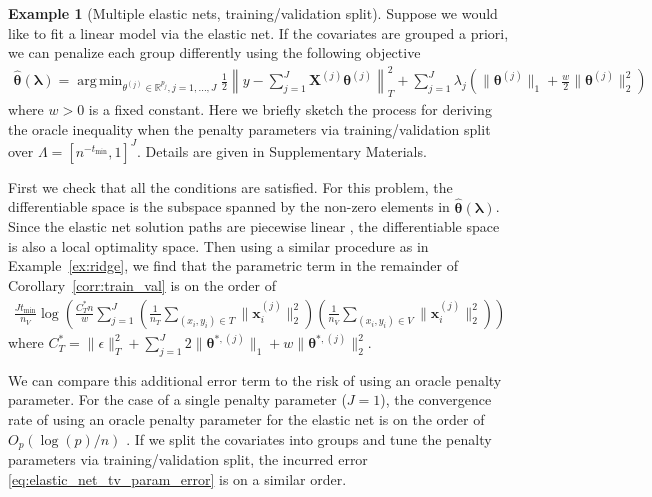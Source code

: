 \documentclass[12pt]{article} %
\theoremstyle{definition}
\newtheorem{example}{Example}
\DeclareMathOperator*{\argmin}{arg\,min}
\begin{document}
\begin{example}[Multiple elastic nets, training/validation split]
	\label{ex:elastic_net_tv}
	Suppose we would like to fit a linear model via the elastic net.
	If the covariates are grouped a priori, we can penalize each group differently using the following objective
	\begin{align}
	\hat{\boldsymbol{\theta}}(\boldsymbol{\lambda})
	=\argmin_{\theta^{(j)} \in \mathbb{R}^{p_j}, j = 1,...,J}
	\frac{1}{2} \left \| y - \sum_{j=1}^J \boldsymbol{X}^{(j)} \boldsymbol{\theta}^{(j)} \right \|_T^2
	+ \sum_{j=1}^J \lambda_j \left(
	\| \boldsymbol{\theta}^{(j)}\|_1
	+ \frac{w}{2} \| \boldsymbol{\theta}^{(j)}\|_2^2
	\right)
	\label{eq:elastic_net_ex}
	\end{align}
	where $w > 0$ is a fixed constant.
	Here we briefly sketch the process for deriving the oracle inequality when the penalty parameters via training/validation split over $\Lambda = [n^{-t_{\min}}, 1]^J$.
	Details are given in Supplementary Materials.

	First we check that all the conditions are satisfied.
	For this problem, the differentiable space is the subspace spanned by the non-zero elements in $\hat{\boldsymbol{\theta}}(\boldsymbol{\lambda})$.
	Since the elastic net solution paths are piecewise linear \citep{zou2003regression}, the differentiable space is also a local optimality space.
	Then using a similar procedure as in Example~\ref{ex:ridge}, we find that the parametric term in the remainder of Corollary~\ref{corr:train_val} is on the order of
	\begin{align}
	\frac{J t_{\min}}{n_{V}}
	\log \left (
	\frac{C^*_T n}{w}
	\sum_{j=1}^J
	\left(\frac{1}{n_T} \sum_{(x_i, y_i) \in T} \|\boldsymbol{x}_i^{(j)}\|^2_2\right)
	\left(\frac{1}{n_V} \sum_{(x_i, y_i) \in V} \|\boldsymbol{x}_i^{(j)}\|^2_2\right)
	\right )
	\label{eq:elastic_net_tv_param_error}
	\end{align}
	where
	$
	C^*_T =
	\|\epsilon\|_{T}^{2}
	+\sum_{j=1}^J
	2 \|\boldsymbol{\theta}^{*,(j)}\|_1
	+ w\|\boldsymbol{\theta}^{*,(j)}\|_2^2
	$.

	We can compare this additional error term to the risk of using an oracle penalty parameter.
	For the case of a single penalty parameter ($J = 1$), the convergence rate of using an oracle penalty parameter for the elastic net is on the order of $O_p(\log(p)/n)$ \citep{bunea2008honest, hebiri2011smooth}.
	If we split the covariates into groups and tune the penalty parameters via training/validation split, the incurred error \eqref{eq:elastic_net_tv_param_error} is on a similar order.
\end{example}
\end{document}
